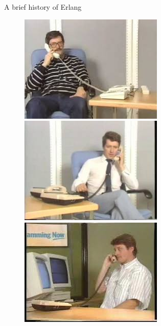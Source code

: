 \documentclass[
  ignorenonframetext,
  aspectratio=169]{beamer}
\begin{document}
\begin{frame}{A brief history of Erlang}
\begin{figure}
\centering
\vspace{20pt}
\begin{minipage}{.24\textwidth}
  \centering
  \includegraphics[width=.9\linewidth]{./img/joe.jpg}
\end{minipage}
\begin{minipage}{.24\textwidth}
  \centering
  \includegraphics[width=.9\linewidth]{./img/mike.jpeg}
\end{minipage}
\begin{minipage}{.24\textwidth}
  \centering
  \includegraphics[width=.9\linewidth]{./img/robert.jpeg}

\end{minipage}
\end{figure}
\end{frame}
\end{document}
